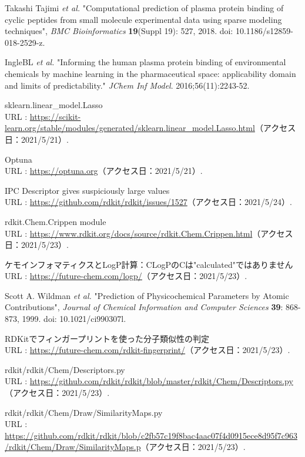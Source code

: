 \documentclass[a4j,11pt]{jarticle}
\begin{document}
\begin{thebibliography}{50}
 Takashi Tajimi \textit{et al.} "Computational prediction of plasma protein binding of cyclic peptides from small molecule experimental data using sparse modeling techniques", \textit{BMC Bioinformatics} \textbf{19}(Suppl 19): 527, 2018. doi: 10.1186/s12859-018-2529-z.

 IngleBL \textit{et al.} "Informing the human plasma protein binding of environmental chemicals by machine learning in the pharmaceutical space: applicability domain and limits of predictability." \textit{JChem Inf Model}. 2016;56(11):2243-52.

 sklearn.linear\_model.Lasso \\URL : \url{https://scikit-learn.org/stable/modules/generated/sklearn.linear_model.Lasso.html}（アクセス日：2021/5/21）.

 Optuna \\URL : \url{https://optuna.org}（アクセス日：2021/5/21）.

 IPC Descriptor gives suspiciously large values  \\URL : \url{https://github.com/rdkit/rdkit/issues/1527}（アクセス日：2021/5/24）.

 rdkit.Chem.Crippen module  \\URL : \url{https://www.rdkit.org/docs/source/rdkit.Chem.Crippen.html}（アクセス日：2021/5/23）.

 ケモインフォマティクスとLogP計算：CLogPのCは"calculated"ではありません \\URL : \url{https://future-chem.com/logp/}（アクセス日：2021/5/23）.

 Scott A. Wildman \textit{et al.} "Prediction of Physicochemical Parameters by Atomic Contributions", \textit{Journal of Chemical Information and Computer Sciences} \textbf{39}: 868-873, 1999. doi: 10.1021/ci990307l.

 RDKitでフィンガープリントを使った分子類似性の判定\\URL :  \url{https://future-chem.com/rdkit-fingerprint/}（アクセス日：2021/5/23）.

 rdkit/rdkit/Chem/Descriptors.py \\URL : \url{https://github.com/rdkit/rdkit/blob/master/rdkit/Chem/Descriptors.py}（アクセス日：2021/5/23）.

 rdkit/rdkit/Chem/Draw/SimilarityMaps.py \\URL : \url{https://github.com/rdkit/rdkit/blob/c2fb57c19f8bac4aac07f4d0915ece8d95f7c963/rdkit/Chem/Draw/SimilarityMaps.p}（アクセス日：2021/5/23）.


\end{thebibliography}
\end{document}
